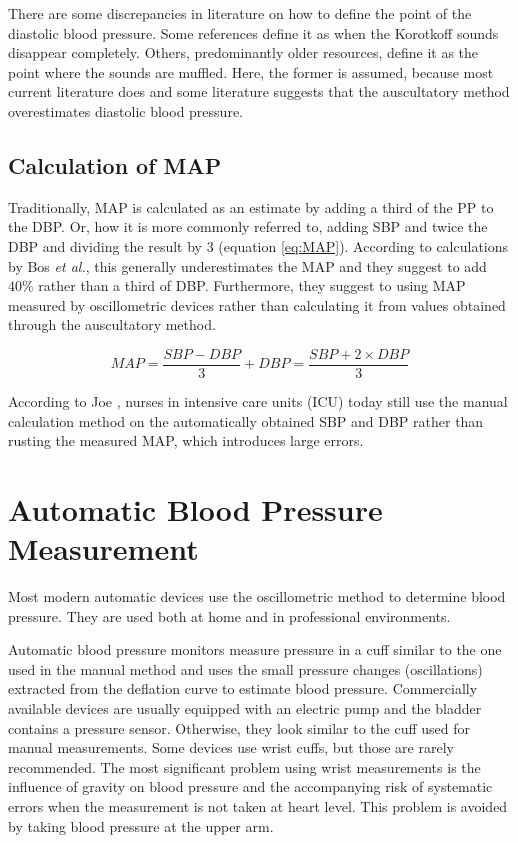 There are some discrepancies in literature on how to define the point of the diastolic blood pressure. Some references define it as when the Korotkoff sounds disappear completely. \cite{Lloyd2018,Reeves1995} Others, predominantly older resources, define it as the point where the sounds are muffled.\cite{Boron2012} Here, the former is assumed, because most current literature does and some literature suggests that the auscultatory method overestimates diastolic blood pressure. \cite{Chandrasekhar2019}

\subsection{Calculation of MAP}
Traditionally, MAP is calculated as an estimate by adding a third of the PP to the DBP. Or, how it is more commonly referred to, adding SBP and twice the DBP and dividing the result by 3 (equation \ref{eq:MAP}). According to calculations by Bos \textit{et al.}, this generally underestimates the MAP and they suggest to add $40\%$ rather than a third of DBP. Furthermore, they suggest to using MAP measured by oscillometric devices rather than calculating it from values obtained through the auscultatory method. \cite{Bos2007}

\begin{equation}
\label{eq:MAP}
MAP = \frac{SBP-DBP}{3}+DBP = \frac{SBP+2\times DBP}{3}
\end{equation}

According to Joe \cite{Joe2019}, nurses in intensive care units (ICU) today still use the manual calculation method on the automatically obtained SBP and DBP rather than rusting the measured MAP, which introduces large errors.

\section{Automatic Blood Pressure Measurement}

Most modern automatic devices use the oscillometric method to determine blood pressure. They are used both at home and in professional environments.

Automatic blood pressure monitors measure pressure in a cuff similar to the one used in the manual method and uses the small pressure changes (oscillations) extracted from the deflation curve to estimate blood pressure. Commercially available devices are usually equipped with an electric pump and the bladder contains a pressure sensor. Otherwise, they look similar to the cuff used for manual measurements. Some devices use wrist cuffs, but those are rarely recommended. \cite{BIHS2020} The most significant problem using wrist measurements is the influence of gravity on blood pressure and the accompanying risk of systematic errors when the measurement is not taken at heart level. \cite{Boron2012} This problem is avoided by taking blood pressure at the upper arm.

